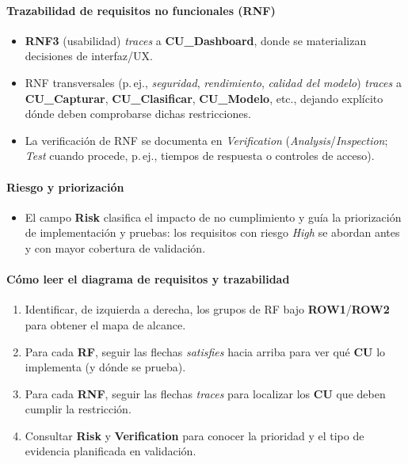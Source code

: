 \paragraph{Trazabilidad de requisitos no funcionales (RNF)}
\begin{itemize}
  \item \textbf{RNF3} (usabilidad) \emph{traces} a \textbf{CU\_Dashboard}, donde se materializan decisiones de interfaz/UX.
  \item RNF transversales (p.\,ej., \emph{seguridad}, \emph{rendimiento}, \emph{calidad del modelo}) \emph{traces} a \textbf{CU\_Capturar}, \textbf{CU\_Clasificar}, \textbf{CU\_Modelo}, etc., dejando explícito dónde deben comprobarse dichas restricciones.
  \item La verificación de RNF se documenta en \emph{Verification} (\emph{Analysis}/\emph{Inspection}; \emph{Test} cuando procede, p.\,ej., tiempos de respuesta o controles de acceso).
\end{itemize}

\paragraph{Riesgo y priorización}
\begin{itemize}
  \item El campo \textbf{Risk} clasifica el impacto de no cumplimiento y guía la priorización de implementación y pruebas: los requisitos con riesgo \emph{High} se abordan antes y con mayor cobertura de validación.
\end{itemize}

\paragraph{Cómo leer el diagrama de requisitos y trazabilidad}
\begin{enumerate}
  \item Identificar, de izquierda a derecha, los grupos de RF bajo \textbf{ROW1}/\textbf{ROW2} para obtener el mapa de alcance.
  \item Para cada \textbf{RF}, seguir las flechas \emph{satisfies} hacia arriba para ver qué \textbf{CU} lo implementa (y dónde se prueba).
  \item Para cada \textbf{RNF}, seguir las flechas \emph{traces} para localizar los \textbf{CU} que deben cumplir la restricción.
  \item Consultar \textbf{Risk} y \textbf{Verification} para conocer la prioridad y el tipo de evidencia planificada en validación.
\end{enumerate}


